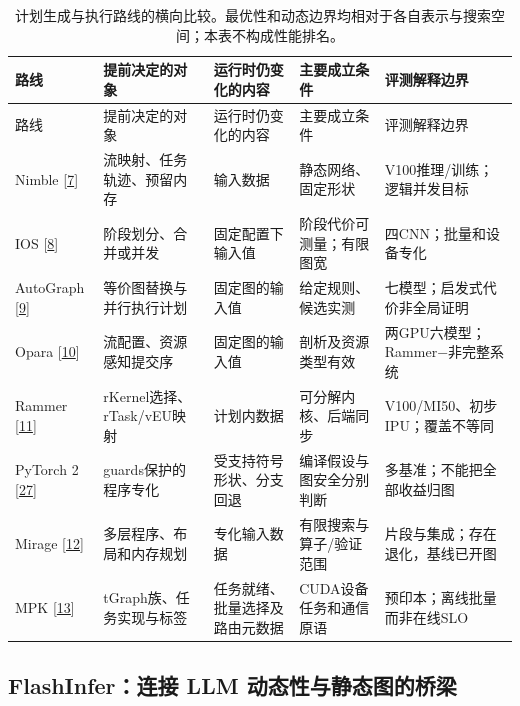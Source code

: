 \documentclass[
  UTF8,
  zihao=5]{ctexart}
\begin{document}
\begin{longtable}[]{@{}
  >{\raggedright\arraybackslash}p{}
  >{\raggedright\arraybackslash}p{}
  >{\raggedright\arraybackslash}p{}
  >{\raggedright\arraybackslash}p{}
  >{\raggedright\arraybackslash}p{}@{}}
\caption{计划生成与执行路线的横向比较。最优性和动态边界均相对于各自表示与搜索空间；本表不构成性能排名。}\tabularnewline
\toprule
路线 & 提前决定的对象 & 运行时仍变化的内容 & 主要成立条件 &
评测解释边界 \\
\midrule
\endfirsthead
\toprule
路线 & 提前决定的对象 & 运行时仍变化的内容 & 主要成立条件 &
评测解释边界 \\
\midrule
\endhead
Nimble {[}\protect\hyperlink{ref-kwon2020nimble}{7}{]} &
流映射、任务轨迹、预留内存 & 输入数据 & 静态网络、固定形状 &
V100推理/训练；逻辑并发目标 \\
IOS {[}\protect\hyperlink{ref-ding2021ios}{8}{]} & 阶段划分、合并或并发
& 固定配置下输入值 & 阶段代价可测量；有限图宽 & 四CNN；批量和设备专化 \\
AutoGraph {[}\protect\hyperlink{ref-zhao2023autograph}{9}{]} &
等价图替换与并行执行计划 & 固定图的输入值 & 给定规则、候选实测 &
七模型；启发式代价非全局证明 \\
Opara {[}\protect\hyperlink{ref-chen2025opara}{10}{]} &
流配置、资源感知提交序 & 固定图的输入值 & 剖析及资源类型有效 &
两GPU六模型；Rammer−非完整系统 \\
Rammer {[}\protect\hyperlink{ref-ma2020rammer}{11}{]} &
rKernel选择、rTask/vEU映射 & 计划内数据 & 可分解内核、后端同步 &
V100/MI50、初步IPU；覆盖不等同 \\
PyTorch 2 {[}\protect\hyperlink{ref-ansel2024pytorch2}{27}{]} &
guards保护的程序专化 & 受支持符号形状、分支回退 &
编译假设与图安全分别判断 & 多基准；不能把全部收益归图 \\
Mirage {[}\protect\hyperlink{ref-wu2025mirage}{12}{]} &
多层程序、布局和内存规划 & 专化输入数据 & 有限搜索与算子/验证范围 &
片段与集成；存在退化，基线已开图 \\
MPK {[}\protect\hyperlink{ref-cheng2026mpk}{13}{]} &
tGraph族、任务实现与标签 & 任务就绪、批量选择及路由元数据 &
CUDA设备任务和通信原语 & 预印本；离线批量而非在线SLO \\
\bottomrule
\end{longtable}

\hypertarget{flashinferux8fdeux63a5-llm-ux52a8ux6001ux6027ux4e0eux9759ux6001ux56feux7684ux6865ux6881}{%
\subsection{FlashInfer：连接 LLM
动态性与静态图的桥梁}\label{flashinferux8fdeux63a5-llm-ux52a8ux6001ux6027ux4e0eux9759ux6001ux56feux7684ux6865ux6881}}
\end{document}
